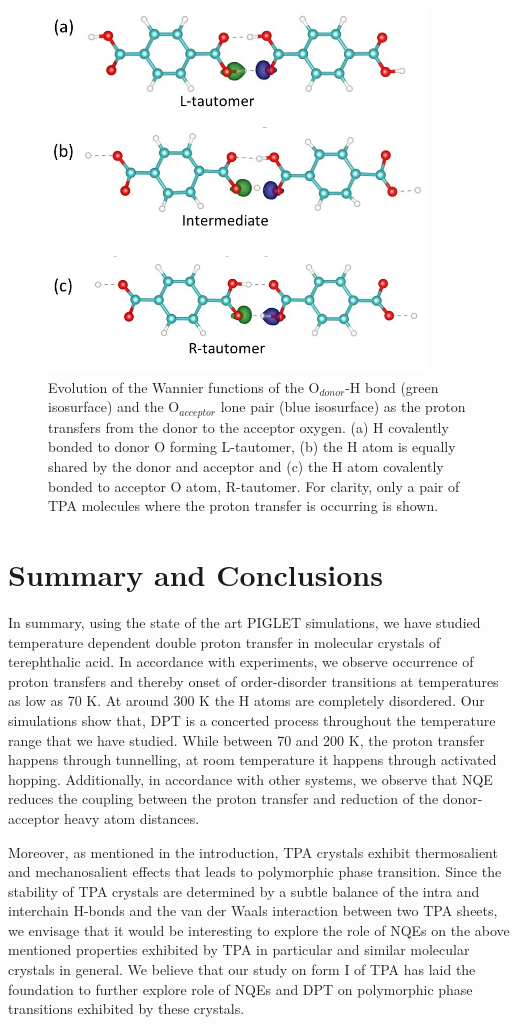 \begin{figure}
\centering
\includegraphics[width=10cm ]{./Chapter1/new_figures/function_wann.jpg}
\caption{Evolution of the Wannier functions of the O$_{donor}$-H bond (green 
isosurface) and the O$_{acceptor}$ lone pair (blue isosurface) as the proton
transfers from the donor to the acceptor oxygen. (a) H covalently bonded to 
donor O forming L-tautomer, (b) the H atom is equally shared by the donor and 
acceptor and (c) the H atom covalently bonded to acceptor O atom, R-tautomer. For
clarity, only a pair of TPA molecules where the proton transfer is occurring is 
shown.}
\label{fig:wannierII}
\end{figure}


\section{Summary and Conclusions}
\label{concl}

In summary, using the state of the art PIGLET simulations, we have studied
temperature dependent double proton transfer in molecular crystals of
terephthalic acid. In accordance
with experiments, we observe occurrence of proton transfers and thereby
onset of order-disorder transitions at temperatures as low as 70 K.
At around 300 K the H atoms are completely disordered.
Our simulations show that, DPT is a concerted
process throughout the temperature range that we have studied. While between
70 and 200 K, the proton transfer happens through tunnelling, at room temperature
it happens through activated hopping. Additionally, in accordance with
other systems, we observe that NQE reduces the coupling between
the proton transfer and reduction of the donor-acceptor heavy atom distances.

Moreover, as mentioned in the introduction, TPA crystals exhibit
thermosalient and mechanosalient effects that leads to polymorphic
phase transition. Since the stability of TPA crystals are determined
by a subtle balance of the intra and interchain H-bonds and the
van der Waals interaction between two TPA sheets, we envisage that
it would be interesting to explore the role of NQEs on the above mentioned properties exhibited by TPA in particular and similar
molecular crystals in general. We believe that our study on form I
of TPA has laid the foundation to further explore role of NQEs and DPT on
polymorphic phase transitions exhibited by these crystals.
